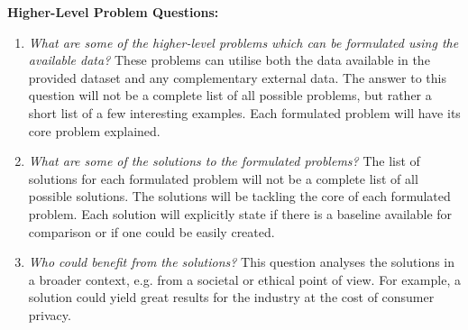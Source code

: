 \begin{description}
  \item \textbf{Higher-Level Problem Questions:}
  \begin{enumerate}
    \item \textit{What are some of the higher-level problems which can be formulated using the available data?} \newline
    These problems can utilise both the data available in the provided dataset and any complementary external data.
    The answer to this question will not be a complete list of all possible problems, but rather a short list of a few interesting examples.
    Each formulated problem will have its core problem explained.
    \item \textit{What are some of the solutions to the formulated problems?} \newline
    The list of solutions for each formulated problem will not be a complete list of all possible solutions.
    The solutions will be tackling the core of each formulated problem.
    Each solution will explicitly state if there is a baseline available for comparison or if one could be easily created.
    \item \textit{Who could benefit from the solutions?} \newline
    This question analyses the solutions in a broader context, e.g. from a societal or ethical point of view.
    For example, a solution could yield great results for the industry at the cost of consumer privacy.
  \end{enumerate}


\end{description}

